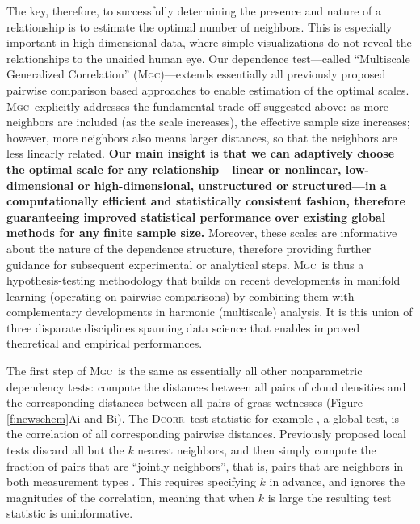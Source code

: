 \documentclass[11pt]{article}
\providecommand{\sct}[1]{{\normalfont\textsc{#1}}}
\newcommand{\Mgc}{\sct{Mgc}}
\newcommand{\Dcorr}{\sct{Dcorr}}
\begin{document}
The key, therefore, to successfully determining the presence and nature of a relationship is to estimate the optimal number of neighbors.
This is especially important in high-dimensional data, where simple visualizations do not reveal the relationships to the unaided human eye.
Our  dependence test---called ``Multiscale Generalized Correlation'' (\Mgc)---extends essentially all previously proposed pairwise comparison based approaches to enable estimation of the  optimal scales.   
\Mgc~explicitly addresses the fundamental trade-off suggested above: as more neighbors are included (as the scale increases), the effective sample size increases; however, more neighbors also means larger distances, so that the neighbors are less linearly related.
\textbf{Our main insight is that we can adaptively choose the optimal scale for any relationship---linear or nonlinear, low-dimensional or high-dimensional, unstructured or structured---in a computationally efficient and statistically consistent fashion, therefore guaranteeing improved statistical performance over existing global methods for any finite sample size.}
Moreover, these scales are informative about the nature of the dependence structure, therefore providing further guidance for subsequent experimental or analytical steps. \Mgc~is thus a hypothesis-testing methodology that builds on recent developments in manifold learning (operating on pairwise comparisons) by combining them with complementary developments in harmonic (multiscale) analysis. 
It is this union of three disparate disciplines spanning data science that enables improved theoretical and empirical performances. 


The first step of \Mgc~is the same as essentially all other nonparametric dependency tests:
compute the distances between all pairs of cloud densities and the corresponding distances between all pairs of grass wetnesses (Figure \ref{f:newschem}{\color{magenta}Ai} and {\color{magenta}Bi}).
The \Dcorr~test statistic for example \cite{SzekelyRizzo2009}, a global test, is the correlation of all corresponding pairwise distances.
Previously proposed local tests discard all but the $k$ nearest neighbors, and then simply compute the fraction of pairs that are ``jointly neighbors'', that is, pairs that are neighbors in both measurement types \cite{Friedman1983,Schilling1986}. This requires specifying $k$ in advance, and ignores the magnitudes of the correlation, meaning that when $k$ is large the resulting test statistic is  uninformative. 
\end{document}
